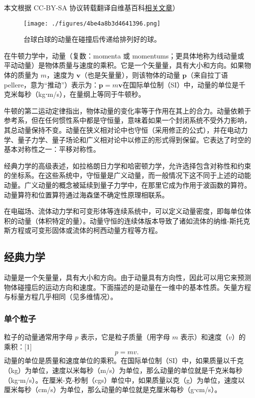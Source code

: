 
本文根据 CC-BY-SA 协议转载翻译自维基百科\href{https://en.wikipedia.org/wiki/Momentum#Conservation}{相关文章}）

\begin{figure}[ht]
\centering
\texttt{[image: ./figures/4be4a8b3d4641396.png]}
\caption{台球白球的动量在碰撞后传递给排列好的球。} \label{fig_DL_1}
\end{figure}
在牛顿力学中，动量（复数：momenta 或 momentums；更具体地称为线动量或平动动量）是物体质量与速度的乘积。它是一个矢量量，具有大小和方向。如果物体的质量为 \( m \)，速度为 \( \mathbf{v} \)（也是矢量量），则该物体的动量 \( \mathbf{p} \)（来自拉丁语 pellere，意为“推动”）表示为：\(\mathbf{p} = m \mathbf{v}\)在国际单位制（SI）中，动量的单位是千克米每秒（kg⋅m/s），在量纲上等同于牛顿秒。

牛顿的第二运动定律指出，物体动量的变化率等于作用在其上的合力。动量依赖于参考系，但在任何惯性系中都是守恒量，意味着如果一个封闭系统不受外力影响，其总动量保持不变。动量在狭义相对论中也守恒（采用修正的公式），并在电动力学、量子力学、量子场论和广义相对论中以修正的形式得到保留。它表达了时空的基本对称性之一：平移对称性。

经典力学的高级表述，如拉格朗日力学和哈密顿力学，允许选择包含对称性和约束的坐标系。在这些系统中，守恒量是广义动量，而一般情况下这不同于上述的动能动量。广义动量的概念被延续到量子力学中，在那里它成为作用于波函数的算符。动量算符和位置算符通过海森堡不确定性原理相联系。

在电磁场、流体动力学和可变形体等连续系统中，可以定义动量密度，即每单位体积的动量（体积特定的量）。动量守恒的连续体版本导致了诸如流体的纳维-斯托克斯方程或可变形固体或流体的柯西动量方程等方程。
\subsection{经典力学}
动量是一个矢量量，具有大小和方向。由于动量具有方向性，因此可以用它来预测物体碰撞后的运动方向和速度。下面描述的是动量在一维中的基本性质。矢量方程与标量方程几乎相同（见多维情况）。
\subsubsection{单个粒子}
粒子的动量通常用字母 \( p \) 表示，它是粒子质量（用字母 \( m \) 表示）和速度（\( v \)）的乘积：[1]
\[
p = mv.~
\]
动量的单位是质量和速度单位的乘积。在国际单位制（SI）中，如果质量以千克（kg）为单位，速度以米每秒（m/s）为单位，那么动量的单位就是千克米每秒（kg⋅m/s）。在厘米-克-秒制（cgs）单位中，如果质量以克（g）为单位，速度以厘米每秒（cm/s）为单位，那么动量的单位就是克厘米每秒（g⋅cm/s）。

